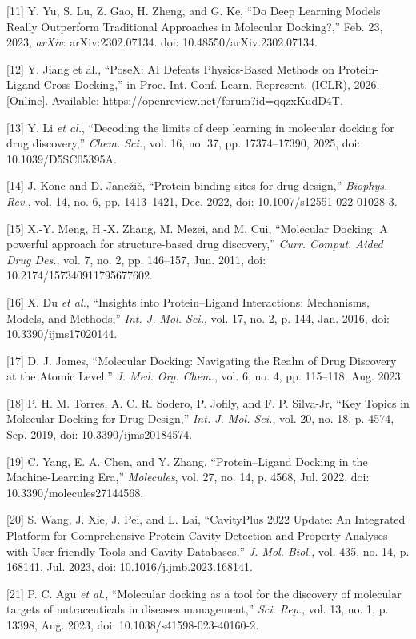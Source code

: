 {[}11{]} Y. Yu, S. Lu, Z. Gao, H. Zheng, and G. Ke, ``Do Deep Learning Models Really Outperform Traditional Approaches in Molecular Docking?,'' Feb. 23, 2023, \emph{arXiv}: arXiv:2302.07134. doi: 10.48550/arXiv.2302.07134.

{[}12{]} Y. Jiang et al., ``PoseX: AI Defeats Physics-Based Methods on Protein-Ligand Cross-Docking,'' in Proc. Int. Conf. Learn. Represent. (ICLR), 2026. {[}Online{]}. Available: https://openreview.net/forum?id=qqzxKudD4T.

{[}13{]} Y. Li \emph{et al.}, ``Decoding the limits of deep learning in molecular docking for drug discovery,'' \emph{Chem. Sci.}, vol. 16, no. 37, pp. 17374--17390, 2025, doi: 10.1039/D5SC05395A.

{[}14{]} J. Konc and D. Janežič, ``Protein binding sites for drug design,'' \emph{Biophys. Rev.}, vol. 14, no. 6, pp. 1413--1421, Dec. 2022, doi: 10.1007/s12551-022-01028-3.

{[}15{]} X.-Y. Meng, H.-X. Zhang, M. Mezei, and M. Cui, ``Molecular Docking: A powerful approach for structure-based drug discovery,'' \emph{Curr. Comput. Aided Drug Des.}, vol. 7, no. 2, pp. 146--157, Jun. 2011, doi: 10.2174/157340911795677602.

{[}16{]} X. Du \emph{et al.}, ``Insights into Protein--Ligand Interactions: Mechanisms, Models, and Methods,'' \emph{Int. J. Mol. Sci.}, vol. 17, no. 2, p. 144, Jan. 2016, doi: 10.3390/ijms17020144.

{[}17{]} D. J. James, ``Molecular Docking: Navigating the Realm of Drug Discovery at the Atomic Level,'' \emph{J. Med. Org. Chem.}, vol. 6, no. 4, pp. 115--118, Aug. 2023.

{[}18{]} P. H. M. Torres, A. C. R. Sodero, P. Jofily, and F. P. Silva-Jr, ``Key Topics in Molecular Docking for Drug Design,'' \emph{Int. J. Mol. Sci.}, vol. 20, no. 18, p. 4574, Sep. 2019, doi: 10.3390/ijms20184574.

{[}19{]} C. Yang, E. A. Chen, and Y. Zhang, ``Protein--Ligand Docking in the Machine-Learning Era,'' \emph{Molecules}, vol. 27, no. 14, p. 4568, Jul. 2022, doi: 10.3390/molecules27144568.

{[}20{]} S. Wang, J. Xie, J. Pei, and L. Lai, ``CavityPlus 2022 Update: An Integrated Platform for Comprehensive Protein Cavity Detection and Property Analyses with User-friendly Tools and Cavity Databases,'' \emph{J. Mol. Biol.}, vol. 435, no. 14, p. 168141, Jul. 2023, doi: 10.1016/j.jmb.2023.168141.

{[}21{]} P. C. Agu \emph{et al.}, ``Molecular docking as a tool for the discovery of molecular targets of nutraceuticals in diseases management,'' \emph{Sci. Rep.}, vol. 13, no. 1, p. 13398, Aug. 2023, doi: 10.1038/s41598-023-40160-2.

